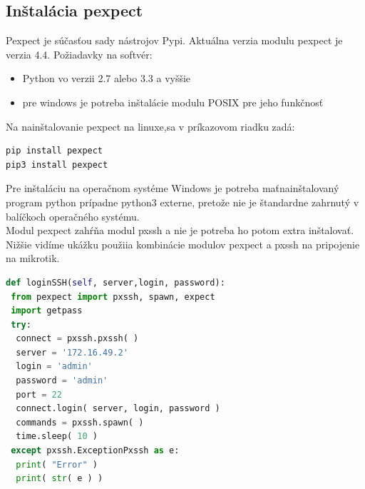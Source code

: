\subsection{Inštalácia pexpect}
Pexpect je súčasťou sady nástrojov Pypi. Aktuálna verzia modulu pexpect je verzia 4.4. Požiadavky na softvér:\begin{itemize}
\item Python vo verzii 2.7 alebo 3.3 a vyššie
\item pre windows je potreba inštalácie modulu POSIX pre jeho funkčnosť
\end{itemize}
Na nainštalovanie pexpect \cite{pexpectinstall} na linuxe,sa v príkazovom riadku zadá:
\begin{lstlisting}[language=python, frame=single, caption=Inštalácia Pexpect, captionpos=b]
pip install pexpect
pip3 install pexpect
\end{lstlisting}  
Pre inštaláciu na operačnom systéme Windows je potreba maťnainštalovaný program python prípadne python3 externe, pretože nie je štandardne zahrnutý v balíčkoch operačného systému.\\
Modul pexpect zahŕňa modul pxssh a nie je potreba ho potom extra inštalovať.\\
Nižšie vidíme ukážku použiia kombinácie modulov pexpect a pxssh na pripojenie na mikrotik.
\newpage
\begin{lstlisting}[language=python, frame=single, caption=Použitie pxssh na pripojenie na router cez protokol SSH, captionpos=b]
def loginSSH(self, server,login, password):
 from pexpect import pxssh, spawn, expect
 import getpass
 try:
  connect = pxssh.pxssh( )
  server = '172.16.49.2'
  login = 'admin'
  password = 'admin'
  port = 22
  connect.login( server, login, password )
  commands = pxssh.spawn( )
  time.sleep( 10 )
 except pxssh.ExceptionPxssh as e:
  print( "Error" )
  print( str( e ) )
\end{lstlisting}  
